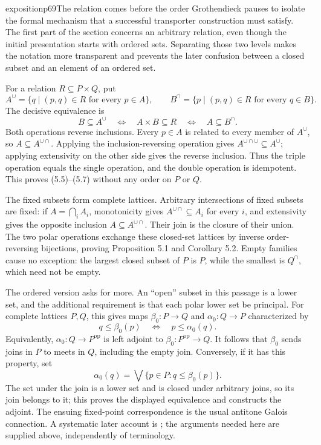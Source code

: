 \begin{dcomment}{exposition}{p69}{The relation comes before the order}
Grothendieck pauses to isolate the formal mechanism that a successful transporter construction must satisfy. The first part of the section concerns an arbitrary relation, even though the initial presentation starts with ordered sets. Separating those two levels makes the notation more transparent and prevents the later confusion between a closed subset and an element of an ordered set.

For a relation $R\subseteq P\times Q$, put
\[
 A^\cup=\{q\mid (p,q)\in R\text{ for every }p\in A\},
 \qquad
 B^\cap=\{p\mid (p,q)\in R\text{ for every }q\in B\}.
\]
The decisive equivalence is
\[
 B\subseteq A^\cup\quad\Longleftrightarrow\quad
 A\times B\subseteq R\quad\Longleftrightarrow\quad
 A\subseteq B^\cap.
\]
Both operations reverse inclusions. Every $p\in A$ is related to every member of $A^\cup$, so $A\subseteq A^{\cup\cap}$. Applying the inclusion-reversing operation gives $A^{\cup\cap\cup}\subseteq A^\cup$; applying extensivity on the other side gives the reverse inclusion. Thus the triple operation equals the single operation, and the double operation is idempotent. This proves (5.5)--(5.7) without any order on $P$ or $Q$.

The fixed subsets form complete lattices. Arbitrary intersections of fixed subsets are fixed: if $A=\bigcap_i A_i$, monotonicity gives $A^{\cup\cap}\subseteq A_i$ for every $i$, and extensivity gives the opposite inclusion $A\subseteq A^{\cup\cap}$. Their join is the closure of their union. The two polar operations exchange these closed-set lattices by inverse order-reversing bijections, proving Proposition 5.1 and Corollary 5.2. Empty families cause no exception: the largest closed subset of $P$ is $P$, while the smallest is $Q^\cap$, which need not be empty.

The ordered version asks for more. An ``open'' subset in this passage is a lower set, and the additional requirement is that each polar lower set be principal. For complete lattices $P,Q$, this gives maps $\beta_0:P\to Q$ and $\alpha_0:Q\to P$ characterized by
\[
 q\leq\beta_0(p)\quad\Longleftrightarrow\quad p\leq\alpha_0(q).
\]
Equivalently, $\alpha_0:Q\to P^{\mathrm{op}}$ is left adjoint to $\beta_0:P^{\mathrm{op}}\to Q$. It follows that $\beta_0$ sends joins in $P$ to meets in $Q$, including the empty join. Conversely, if it has this property, set
\[
 \alpha_0(q)=\bigvee\{p\in P:q\leq\beta_0(p)\}.
\]
The set under the join is a lower set and is closed under arbitrary joins, so its join belongs to it; this proves the displayed equivalence and constructs the adjoint. The ensuing fixed-point correspondence is the usual antitone Galois connection. A systematic later account is \citet[\S0.4, Propositions 7--8 and Theorem 2]{GanterWille1999}; the arguments needed here are supplied above, independently of terminology.
\end{dcomment}

